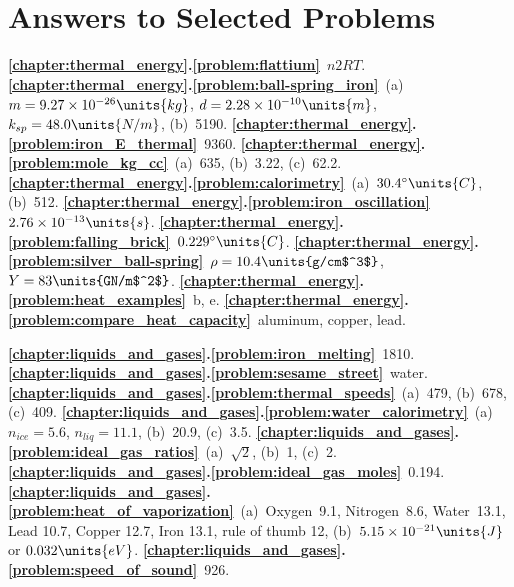 \chapter*{Answers to Selected Problems}

\smallskip

\noindent 
{\bf \ref{chapter:thermal_energy}.\ref{problem:flattium}}~$n2RT$.
{\bf \ref{chapter:thermal_energy}.\ref{problem:ball-spring_iron}}~(a)~$m=9.27\times 10^{-26}\units{kg}$,
$d=2.28\times 10^{-10}\units{m}$, $k_{sp}=48.0\units{N/m}$, (b)~5190.
{\bf \ref{chapter:thermal_energy}.\ref{problem:iron_E_thermal}}~9360.
{\bf \ref{chapter:thermal_energy}.\ref{problem:mole_kg_cc}}~(a)~635, (b)~3.22,
(c)~62.2.
{\bf \ref{chapter:thermal_energy}.\ref{problem:calorimetry}}~(a)~$30.4^\circ\units{C}$, (b)~512.
{\bf \ref{chapter:thermal_energy}.\ref{problem:iron_oscillation}}~$2.76\times 10^{-13}\units{s}$.
{\bf \ref{chapter:thermal_energy}.\ref{problem:falling_brick}}~$0.229^\circ\units{C}$.
{\bf \ref{chapter:thermal_energy}.\ref{problem:silver_ball-spring}}~$\rho=10.4\units{g/cm$^3$}$,
$Y=83\units{GN/m$^2$}$.
{\bf \ref{chapter:thermal_energy}.\ref{problem:heat_examples}}~b, e.
{\bf \ref{chapter:thermal_energy}.\ref{problem:compare_heat_capacity}}~aluminum, copper, lead.
\bigskip



\noindent
{\bf \ref{chapter:liquids_and_gases}.\ref{problem:iron_melting}}~1810.
{\bf \ref{chapter:liquids_and_gases}.\ref{problem:sesame_street}}~water.
{\bf \ref{chapter:liquids_and_gases}.\ref{problem:thermal_speeds}}~(a)~479, (b)~678, (c)~409.
{\bf \ref{chapter:liquids_and_gases}.\ref{problem:water_calorimetry}}~(a)~$n_{ice}=5.6$, $n_{liq}=11.1$, (b)~20.9, (c)~3.5.
{\bf \ref{chapter:liquids_and_gases}.\ref{problem:ideal_gas_ratios}}~(a)~$\sqrt{2}$, (b)~1, (c)~2.
{\bf \ref{chapter:liquids_and_gases}.\ref{problem:ideal_gas_moles}}~0.194.
{\bf \ref{chapter:liquids_and_gases}.\ref{problem:heat_of_vaporization}}~(a)~Oxygen~9.1, 
Nitrogen~8.6, Water~13.1, Lead 10.7, Copper 12.7, Iron 13.1, rule of thumb 12,
(b)~$5.15\times 10^{-21}\units{J}$ or $0.032\units{eV}$.
{\bf \ref{chapter:liquids_and_gases}.\ref{problem:speed_of_sound}}~926.

\bigskip


\noindent

\bigskip



\noindent
